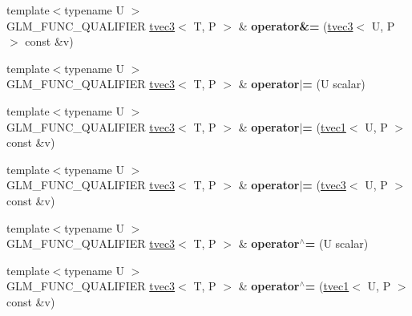 \begin{DoxyCompactItemize}
\item 
\hypertarget{structglm_1_1tvec3_a6ce7276861f4b1402c5dcf4324fac897}{{\footnotesize template$<$typename U $>$ }\\G\-L\-M\-\_\-\-F\-U\-N\-C\-\_\-\-Q\-U\-A\-L\-I\-F\-I\-E\-R \hyperlink{structglm_1_1tvec3}{tvec3}$<$ T, P $>$ \& {\bfseries operator\&=} (\hyperlink{structglm_1_1tvec3}{tvec3}$<$ U, P $>$ const \&v)}\label{structglm_1_1tvec3_a6ce7276861f4b1402c5dcf4324fac897}

\item 
\hypertarget{structglm_1_1tvec3_a9360cf3807e8083c69a12ffc6151a981}{{\footnotesize template$<$typename U $>$ }\\G\-L\-M\-\_\-\-F\-U\-N\-C\-\_\-\-Q\-U\-A\-L\-I\-F\-I\-E\-R \hyperlink{structglm_1_1tvec3}{tvec3}$<$ T, P $>$ \& {\bfseries operator$\vert$=} (U scalar)}\label{structglm_1_1tvec3_a9360cf3807e8083c69a12ffc6151a981}

\item 
\hypertarget{structglm_1_1tvec3_a36f603bc6496f2bc32b3e3001ba38e57}{{\footnotesize template$<$typename U $>$ }\\G\-L\-M\-\_\-\-F\-U\-N\-C\-\_\-\-Q\-U\-A\-L\-I\-F\-I\-E\-R \hyperlink{structglm_1_1tvec3}{tvec3}$<$ T, P $>$ \& {\bfseries operator$\vert$=} (\hyperlink{structglm_1_1tvec1}{tvec1}$<$ U, P $>$ const \&v)}\label{structglm_1_1tvec3_a36f603bc6496f2bc32b3e3001ba38e57}

\item 
\hypertarget{structglm_1_1tvec3_ad176614ebae121c5efbb4a28c29080ef}{{\footnotesize template$<$typename U $>$ }\\G\-L\-M\-\_\-\-F\-U\-N\-C\-\_\-\-Q\-U\-A\-L\-I\-F\-I\-E\-R \hyperlink{structglm_1_1tvec3}{tvec3}$<$ T, P $>$ \& {\bfseries operator$\vert$=} (\hyperlink{structglm_1_1tvec3}{tvec3}$<$ U, P $>$ const \&v)}\label{structglm_1_1tvec3_ad176614ebae121c5efbb4a28c29080ef}

\item 
\hypertarget{structglm_1_1tvec3_a2cde30e231cec7c356125b3fa4b7fe31}{{\footnotesize template$<$typename U $>$ }\\G\-L\-M\-\_\-\-F\-U\-N\-C\-\_\-\-Q\-U\-A\-L\-I\-F\-I\-E\-R \hyperlink{structglm_1_1tvec3}{tvec3}$<$ T, P $>$ \& {\bfseries operator$^\wedge$=} (U scalar)}\label{structglm_1_1tvec3_a2cde30e231cec7c356125b3fa4b7fe31}

\item 
\hypertarget{structglm_1_1tvec3_a03040ddfeb97c166a0f6e4888f4f75fe}{{\footnotesize template$<$typename U $>$ }\\G\-L\-M\-\_\-\-F\-U\-N\-C\-\_\-\-Q\-U\-A\-L\-I\-F\-I\-E\-R \hyperlink{structglm_1_1tvec3}{tvec3}$<$ T, P $>$ \& {\bfseries operator$^\wedge$=} (\hyperlink{structglm_1_1tvec1}{tvec1}$<$ U, P $>$ const \&v)}\label{structglm_1_1tvec3_a03040ddfeb97c166a0f6e4888f4f75fe}


\end{DoxyCompactItemize}
